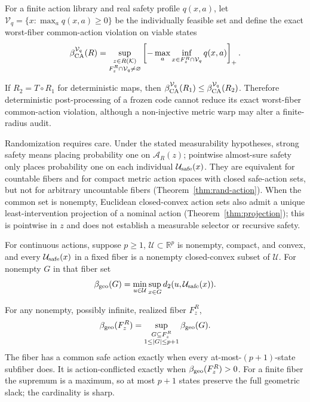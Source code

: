 For a finite action library and real safety profile $q(x,a)$, let
$\mathcal V_q=\{x:\max_a q(x,a)\geq0\}$ be the individually feasible set and define the exact
worst-fiber common-action violation on viable states
\[
 \beta_{\rm CA}^{\mathcal V_q}(R)=
 \sup_{\substack{z\in R(\mathcal{K})\\F_z^R\cap\mathcal V_q\neq\varnothing}}
 \left[-\max_a\inf_{x\in F_z^R\cap\mathcal V_q}q(x,a)\right]_+.
\]
\begin{proposition}
\label{prop:action-data-processing}
If $R_2=T\circ R_1$ for deterministic maps, then
$\beta_{\rm CA}^{\mathcal V_q}(R_1)\leq\beta_{\rm CA}^{\mathcal V_q}(R_2)$.  Therefore deterministic post-processing of a frozen
code cannot reduce its exact worst-fiber common-action violation, although a non-injective metric
warp may alter a finite-radius audit.
\end{proposition}

Randomization requires care.  Under the stated measurability hypotheses, strong safety means placing probability one on
$\mathcal A_R(z)$; pointwise almost-sure safety only places probability one on each individual
$\mathcal{U}_{\mathrm{safe}}(x)$.  They are equivalent for countable fibers and for compact metric action spaces with
closed safe-action sets, but not for arbitrary uncountable fibers
(Theorem~\ref{thm:rand-action}).  When the common set is nonempty, Euclidean closed-convex action
sets also admit a unique least-intervention projection of a nominal action
(Theorem~\ref{thm:projection}); this is pointwise in $z$ and does not establish a measurable
selector or recursive safety.

For continuous actions, suppose $p\geq1$, $\mathcal U\subset\mathbb R^p$ is nonempty, compact,
and convex, and every $\mathcal{U}_{\mathrm{safe}}(x)$ in a fixed fiber is a nonempty closed-convex subset of
$\mathcal U$.  For nonempty $G$ in that fiber set
\[
 \beta_{\rm geo}(G)=\min_{u\in\mathcal U}\sup_{x\in G}d_2(u,\mathcal{U}_{\mathrm{safe}}(x)).
\]
\begin{theorem}\label{thm:helly-action}
For any nonempty, possibly infinite, realized fiber $F_z^R$,
\[
 \beta_{\rm geo}(F_z^R)=
 \sup_{\substack{G\subseteq F_z^R\\1\leq |G|\leq p+1}}\beta_{\rm geo}(G).
\]
The fiber has a common safe action exactly when every at-most-$(p+1)$-state subfiber does.  It is
action-conflicted exactly when $\beta_{\rm geo}(F_z^R)>0$.  For a finite fiber the supremum is a
maximum, so at most $p+1$ states preserve the full geometric slack; the cardinality is sharp.
\end{theorem}

